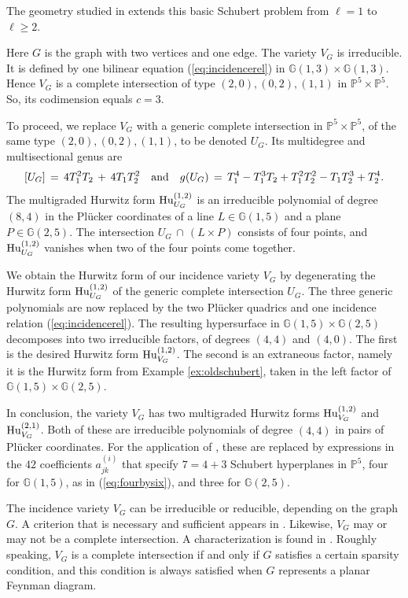 \documentclass[12pt]{article}
\theoremstyle{definition}
\newenvironment{example}
{\pushQED{\qed}\renewcommand{\qedsymbol}{$\diamond$}\examplex}
{\popQED\endexamplex}
\newcommand{\bG}{\mathbb G}
\newcommand{\bP}{\mathbb P}
\begin{document}
The geometry studied in
 \cite{HMPS1, HMPS2} extends this basic Schubert problem from $\ell = 1$ to $\ell \geq 2$.

\begin{example}[$\ell=2$] \label{ex:oneedge}
Here $G$ is the graph with two vertices and one edge.
The variety $V_G$ is irreducible. It is defined by one bilinear equation
(\ref{eq:incidencerel})  in $\bG(1,3) \times \bG(1,3)$.
Hence $V_G$ is a complete intersection of
type $(2,0),(0,2),(1,1)$ in  $\bP^5 \times \bP^5$.
So, its codimension equals $c=3$.

To proceed, we replace $V_G$ with 
a generic complete intersection 
in $\bP^5 \times \bP^5$, of the same type 
$(2,0),(0,2),(1,1)$, to be denoted $U_G$.
Its multidegree and multisectional genus are
$$ [U_G] \,=\, 4 T_1^2 T_2 \,+\, 4 T_1 T_2^2 \quad {\rm and} \quad
g(U_G) \,=\, T_1^4 - T_1^3 T_2 + T_1^2 T_2^2 - T_1 T_2^3 + T_2^4.
$$
The multigraded Hurwitz form  ${\rm Hu}^{(1,2)}_{U_G}$ is an irreducible polynomial 
of degree $(8,4)$  in the Pl\"ucker coordinates of 
a line $L \in \bG(1,5)$ and a plane $P \in \bG(2,5)$.
The intersection $U_G \,\cap \,(L \times P)$
consists of four points, and ${\rm Hu}^{(1,2)}_{U_G}$ 
vanishes when two of the four points come together.

We obtain the Hurwitz form of our incidence variety $V_G$ by degenerating the
Hurwitz form ${\rm Hu}^{(1,2)}_{U_G}$ of the generic
complete intersection $U_G$. The
three generic polynomials are now replaced by
the two Pl\"ucker quadrics and one incidence relation (\ref{eq:incidencerel}).
The resulting hypersurface in $ \bG(1,5) \times \bG(2,5)$
decomposes into two irreducible factors, of degrees $(4,4)$ and $(4,0)$.
The first is the desired Hurwitz form ${\rm Hu}^{(1,2)}_{V_G}$.
The second is an extraneous factor, namely it is the
Hurwitz form from Example \ref{ex:oldschubert}, taken
in the left factor of $ \bG(1,5) \times \bG(2,5)$.

In conclusion, the variety $V_G$ has two multigraded Hurwitz forms
${\rm Hu}^{(1,2)}_{V_G}$ and ${\rm Hu}^{(2,1)}_{V_G}$. Both of
these are irreducible polynomials of degree $(4,4)$ in pairs of
Pl\"ucker coordinates. For the application of \cite{HMPS2},
these are replaced by expressions in the $42$ coefficients
$a^{(i)}_{jk}$ that specify $7=4+3$ Schubert hyperplanes in $\bP^5$,
four for $\bG(1,5)$, as in (\ref{eq:fourbysix}), and three for  $ \bG(2,5)$.
\end{example}

The incidence variety $V_G$ can be irreducible or reducible,
depending on the graph $G$. A criterion that is necessary and sufficient 
appears in \cite[Theorem 5.8]{HMPS1}. Likewise,
$V_G$ may or may not be a complete intersection.
A characterization is found in \cite[Theorem 5.4]{HMPS1}.
Roughly speaking, $V_G$ is a complete intersection if and only if $G$
satisfies a certain sparsity condition, and this condition is
always satisfied when $G$ represents a  planar Feynman diagram.
\end{document}
